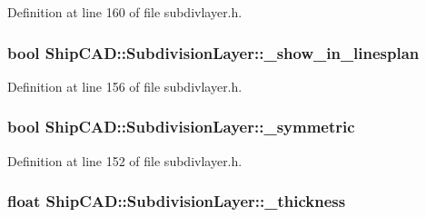 Definition at line 160 of file subdivlayer.\-h.

\hypertarget{classShipCAD_1_1SubdivisionLayer_a373fd987b5f973a995517e7f97fda5ac}{
\subsubsection[{\-\_\-show\-\_\-in\-\_\-linesplan}]{\setlength{\rightskip}{0pt plus 5cm}bool Ship\-C\-A\-D\-::\-Subdivision\-Layer\-::\-\_\-show\-\_\-in\-\_\-linesplan\hspace{0.3cm}{\ttfamily [protected]}}}\label{classShipCAD_1_1SubdivisionLayer_a373fd987b5f973a995517e7f97fda5ac}


Definition at line 156 of file subdivlayer.\-h.

\hypertarget{classShipCAD_1_1SubdivisionLayer_aaeddcdf1d08d84c76c5453f4a71fbe7a}{
\subsubsection[{\-\_\-symmetric}]{\setlength{\rightskip}{0pt plus 5cm}bool Ship\-C\-A\-D\-::\-Subdivision\-Layer\-::\-\_\-symmetric\hspace{0.3cm}{\ttfamily [protected]}}}\label{classShipCAD_1_1SubdivisionLayer_aaeddcdf1d08d84c76c5453f4a71fbe7a}


Definition at line 152 of file subdivlayer.\-h.

\hypertarget{classShipCAD_1_1SubdivisionLayer_a00a308fdf03a0c1d9a6fa65f965e7942}{
\subsubsection[{\-\_\-thickness}]{\setlength{\rightskip}{0pt plus 5cm}float Ship\-C\-A\-D\-::\-Subdivision\-Layer\-::\-\_\-thickness\hspace{0.3cm}{\ttfamily [protected]}}}\label{classShipCAD_1_1SubdivisionLayer_a00a308fdf03a0c1d9a6fa65f965e7942}


